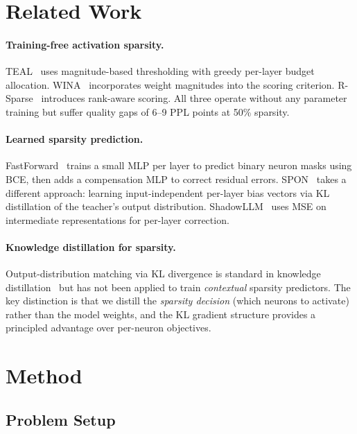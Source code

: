 \documentclass[11pt,a4paper]{article}
\begin{document}
\section{Related Work}

\paragraph{Training-free activation sparsity.}
TEAL~\cite{liu2024teal} uses magnitude-based thresholding with greedy per-layer budget allocation.
WINA~\cite{shen2024wina} incorporates weight magnitudes into the scoring criterion.
R-Sparse~\cite{zhang2024rsparse} introduces rank-aware scoring.
All three operate without any parameter training but suffer quality gaps of 6--9 PPL points at 50\% sparsity.

\paragraph{Learned sparsity prediction.}
FastForward~\cite{wang2024fastforward} trains a small MLP per layer to predict binary neuron masks using BCE, then adds a compensation MLP to correct residual errors.
SPON~\cite{zhou2024spon} takes a different approach: learning input-independent per-layer bias vectors via KL distillation of the teacher's output distribution.
ShadowLLM~\cite{chen2024shadowllm} uses MSE on intermediate representations for per-layer correction.

\paragraph{Knowledge distillation for sparsity.}
Output-distribution matching via KL divergence is standard in knowledge distillation~\cite{hinton2015distilling} but has not been applied to train \emph{contextual} sparsity predictors.
The key distinction is that we distill the \emph{sparsity decision} (which neurons to activate) rather than the model weights, and the KL gradient structure provides a principled advantage over per-neuron objectives.

\section{Method}
\label{sec:method}

\subsection{Problem Setup}
\end{document}
